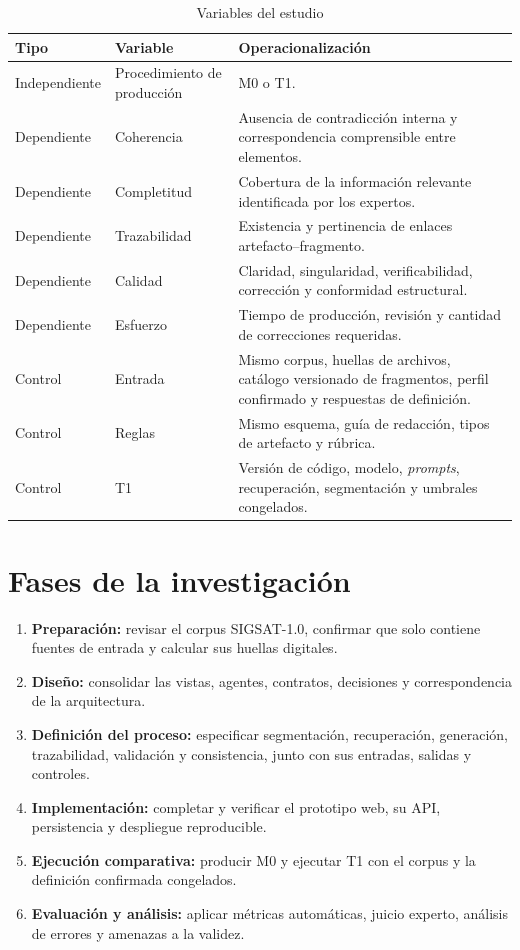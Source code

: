 \begin{table}[H]
  \centering
  \caption{Variables del estudio}
  \label{tab:variables}
  \small
  \begin{tabularx}{\textwidth}{p{3.0cm}p{3.5cm}Y}
    \toprule
    Tipo & Variable & Operacionalización \\
    \midrule
    Independiente & Procedimiento de producción & M0 o T1. \\
    Dependiente & Coherencia & Ausencia de contradicción interna y correspondencia comprensible entre elementos. \\
    Dependiente & Completitud & Cobertura de la información relevante identificada por los expertos. \\
    Dependiente & Trazabilidad & Existencia y pertinencia de enlaces artefacto--fragmento. \\
    Dependiente & Calidad & Claridad, singularidad, verificabilidad, corrección y conformidad estructural. \\
    Dependiente & Esfuerzo & Tiempo de producción, revisión y cantidad de correcciones requeridas. \\
    Control & Entrada & Mismo corpus, huellas de archivos, catálogo versionado de fragmentos, perfil confirmado y respuestas de definición. \\
    Control & Reglas & Mismo esquema, guía de redacción, tipos de artefacto y rúbrica. \\
    Control & T1 & Versión de código, modelo, \emph{prompts}, recuperación, segmentación y umbrales congelados. \\
    \bottomrule
  \end{tabularx}
\end{table}

\section{Fases de la investigación}

\begin{enumerate}
  \item \textbf{Preparación:} revisar el corpus SIGSAT-1.0, confirmar que solo contiene fuentes de entrada y calcular sus huellas digitales.
  \item \textbf{Diseño:} consolidar las vistas, agentes, contratos, decisiones y correspondencia de la arquitectura.
  \item \textbf{Definición del proceso:} especificar segmentación, recuperación, generación, trazabilidad, validación y consistencia, junto con sus entradas, salidas y controles.
  \item \textbf{Implementación:} completar y verificar el prototipo web, su API, persistencia y despliegue reproducible.
  \item \textbf{Ejecución comparativa:} producir M0 y ejecutar T1 con el corpus y la definición confirmada congelados.
  \item \textbf{Evaluación y análisis:} aplicar métricas automáticas, juicio experto, análisis de errores y amenazas a la validez.
\end{enumerate}

